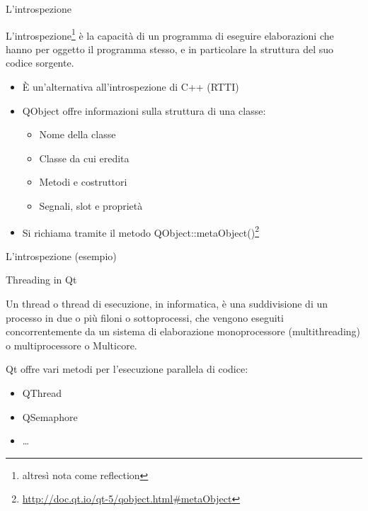 \documentclass[10pt, aspectratio=169]{beamer}
\begin{document}
\begin{frame}{L'introspezione}
	\begin{block}{}
		L'introspezione\footnote{altresì nota come reflection} è la capacità di un programma di eseguire elaborazioni che hanno per oggetto il programma stesso, e in particolare la struttura del suo codice sorgente.
	\end{block}	
	
	\begin{itemize}
		\item È un’alternativa all'introspezione di C++ (RTTI)
		\item {\ttfamily QObject} offre informazioni sulla struttura di una classe:
		\begin{itemize}
			\item Nome della classe
			\item Classe da cui eredita
			\item Metodi e costruttori
			\item Segnali, slot e proprietà
		\end{itemize}
		\item Si richiama tramite il metodo {\ttfamily QObject::metaObject()}\footnote{\url{http://doc.qt.io/qt-5/qobject.html\#metaObject}}
	\end{itemize}
\end{frame}


\begin{frame}{L'introspezione (esempio)}
	\begin{block}{}
		\lst
	\end{block}
\end{frame}

\begin{frame}{Threading in Qt}
	\begin{block}{}
		Un thread o thread di esecuzione, in informatica, è una suddivisione di un processo in due o più filoni o sottoprocessi, che vengono eseguiti concorrentemente da un sistema di elaborazione monoprocessore (multithreading) o multiprocessore o Multicore.
	\end{block}
	\bigskip
	Qt offre vari metodi per l'esecuzione parallela di codice:
	\begin{itemize}
		\item {\ttfamily QThread}
		\item {\ttfamily QSemaphore}
		\item \dots
	\end{itemize}
	
\end{frame}
\end{document}
